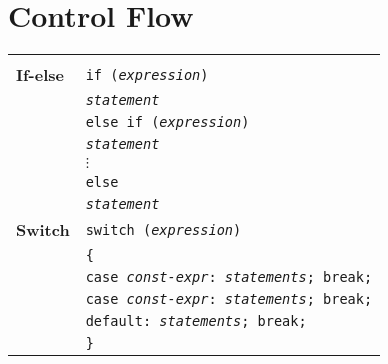 \section{Control Flow }

\begin{minipage}{\linewidth}

\begin{tabularx}{\linewidth}{l|X}
    \hline\\
    \textbf{If-else} & \texttt{if (\textit{expression})} \\ &
    \texttt{\qquad \textit{statement}} \\ &
    \texttt{else if (\textit{expression})} \\ &
    \texttt{\qquad \textit{statement}} \\ &
    $\vdots$\\ &
    \texttt{else} \\ &
    \texttt{\qquad \textit{statement}}\\

    \hline

    \textbf{Switch} & \texttt{switch (\textit{expression})}\\
    & \texttt{\{}\\
    & \texttt{\qquad case \textit{const-expr}: \textit{statements}; break;}\\
    & \texttt{\qquad case \textit{const-expr}: \textit{statements}; break;}\\
    & \texttt{\qquad default: \textit{statements}; break;} \\
    & \texttt{\}}\\


\end{tabularx}
\end{minipage}
